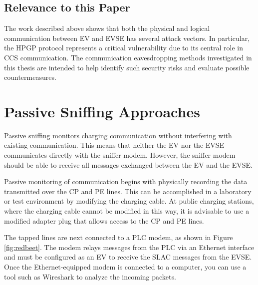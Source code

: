 \documentclass[sigconf]{acmart}
\begin{document}
\subsection{Relevance to this Paper}
The work described above shows that both the physical and logical communication between EV and EVSE has several attack vectors. In particular, the HPGP protocol represents a critical vulnerability due to its central role in CCS communication. The communication eavesdropping methods investigated in this thesis are intended to help identify such security risks and evaluate possible countermeasures.
\fi

\section{Passive Sniffing Approaches}

Passive sniffing monitors charging communication without interfering with existing communication. This means that neither the EV nor the EVSE communicates directly with the sniffer modem. However, the sniffer modem should be able to receive all messages exchanged between the EV and the EVSE.

Passive monitoring of communication begins with physically recording the data transmitted over the CP and PE lines. This can be accomplished in a laboratory or test environment by modifying the charging cable. At public charging stations, where the charging cable cannot be modified in this way, it is advisable to use a modified adapter plug that allows access to the CP and PE lines.

The tapped lines are next connected to a PLC modem, as shown in Figure \ref{fig:redbeet}. The modem relays messages from the PLC via an Ethernet interface and must be configured as an EV to receive the SLAC messages from the EVSE. Once the Ethernet-equipped modem is connected to a computer, you can use a tool such as Wireshark to analyze the incoming packets.
\end{document}
